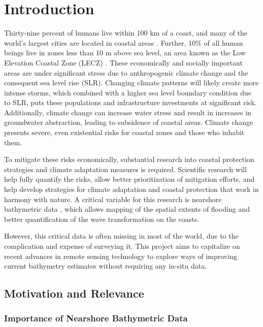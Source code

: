 \chapter{Introduction}

Thirty-nine percent of humans live within 100 km of a coast, and many of the world's largest cities are located in coastal areas \parencite{Magdalena2021}. Further, 10\% of all human beings live in zones less than 10 m above sea level, an area known as the Low Elevation Coastal Zone (LECZ) \parencite{Neumann2015,Lichter2011}. These economically and socially important areas are under significant stress due to anthropogenic climate change and the consequent sea level rise (SLR). Changing climate patterns will likely create more intense storms, which combined with a higher sea level boundary condition due to SLR, puts these populations and infrastructure investments at significant risk. Additionally, climate change can increase water stress and result in increases in groundwater abstraction, leading to subsidence of coastal areas. Climate change presents severe, even existential risks for coastal zones and those who inhabit them.

To mitigate these risks economically, substantial research into coastal protection strategies and climate adaptation measures is required. Scientific research will help fully quantify the risks, allow better prioritization of mitigation efforts, and help develop strategies for climate adaptation and coastal protection that work in harmony with nature. A critical variable for this research is nearshore bathymetric data \parencite{Holman2013}, which allows mapping of the spatial extents of flooding and better quantification of the wave transformation on the coasts. 

However, this critical data is often missing in most of the world, due to the complication and expense of surveying it. This project aims to capitalize on recent advances in remote sensing technology to explore ways of improving current bathymetry estimates without requiring any in-situ data. 

\section{Motivation and Relevance}
\subsection{Importance of Nearshore Bathymetric Data}

